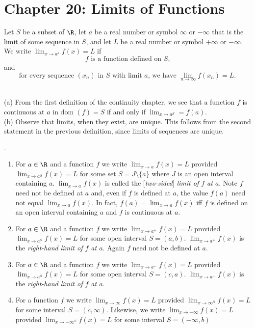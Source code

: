 \documentclass[10pt]{article}
\newcommand{\dom}{\text{dom }}
\begin{document}
\section*{Chapter 20: Limits of Functions}
\begin{defn}
Let $S$ be a subset of $\R$, let $a$ be a real number or symbol $\infty$ or $-\infty$ that is the limit of some sequence in $S$, and let $L$ be a real number or symbol $+\infty$ or $-\infty$. We write $\lim_{x\to a^s}f(x)=L$ if 
\begin{equation*}
    \text{$f$ is a function defined on $S$,}
\end{equation*}
and
\begin{equation*}
    \text{for every sequence $(x_n)$ in $S$ with limit $a$, we have $\lim_{n\to\infty}f(x_n) = L$.}
\end{equation*}
\end{defn}

\begin{rmk}\ \\
(a) From the first definition of the continuity chapter, we see that a function $f$ is continuous at $a$ in $\dom(f) = S$ if and only if $\lim_{x\to a^S} = f(a)$.\\
(b) Observe that limits, when they exist, are unique. This follows from the second statement in the previous definition, since limits of sequences are unique.
\end{rmk}

\begin{defn}.
\begin{enumerate}
    \item For $a\in\R$ and a function $f$ we write $\lim_{x\to a}f(x)=L$ provided $\lim_{x\to a^S}f(x)=L$ for some set $S= J\setminus \{a\}$ where $J$ is an open interval containing $a$. $\lim_{x\to a}f(x)$ is called the [\emph{two-sided}] \emph{limit of $f$ at $a$}. Note $f$ need not be defined at $a$ and, even if $f$ is defined at $a$, the value $f(a)$ need not equal $\lim_{x\to a}f(x)$. In fact, $f(a) = \lim_{x\to a}f(x)$ iff $f$ is defined on an open interval containing $a$ and $f$ is continuous at $a$.
    
    \item For $a\in\R$ and a function $f$ we write $\lim_{x\to a^+}f(x) = L$ provided $\lim_{x\to a^S}f(x) = L$ for some open interval $S= (a,b)$. $\lim_{x\to a^+}f(x)$ is the \emph{right-hand limit of $f$ at $a$}. Again $f$ need not be defined at $a$.
    
    \item For $a\in\R$ and a function $f$ we write $\lim_{x\to a^-}f(x) = L$ provided $\lim_{x\to a^S}f(x) = L$ for some open interval $S= (c, a)$. $\lim_{x\to a^-}f(x)$ is the \emph{right-hand limit of $f$ at $a$}.
    
    \item For a function $f$ we write $\lim_{x\to\infty}f(x) = L$ provided $\lim_{x\to\infty^S} f(x) = L$ for some interval $S = (c, \infty)$. Likewise, we write $\lim_{x\to-\infty}f(x) = L$ provided $\lim_{x\to-\infty^S}f(x) = L$ for some interval $S=(-\infty, b)$
\end{enumerate}
\end{defn}
\end{document}
